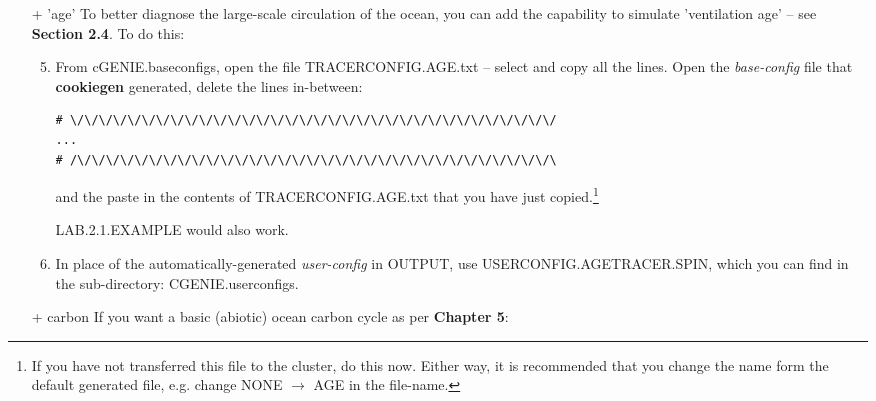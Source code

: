\begin{itemize}[noitemsep]
\setlength{\itemindent}{.05in}

\vspace{2mm}
\item [+ 'age'] To better diagnose the large-scale circulation of the ocean, you can add the capability to simulate 'ventilation age' -- see \textbf{Section 2.4}. To do this:

\begin{enumerate}
\setcounter{enumi}{4}

\vspace{1mm}
\item From \textsf{\footnotesize cGENIE.baseconfigs}, open the file \textsf{\footnotesize TRACERCONFIG.AGE.txt} -- select and copy all the lines. Open the \textit{base-config} file that \textbf{cookiegen} generated, delete the lines in-between:

\vspace{0mm}\footnotesize\begin{verbatim}
# \/\/\/\/\/\/\/\/\/\/\/\/\/\/\/\/\/\/\/\/\/\/\/\/\/\/\/\/\/\/\/\/\/\/
...
# /\/\/\/\/\/\/\/\/\/\/\/\/\/\/\/\/\/\/\/\/\/\/\/\/\/\/\/\/\/\/\/\/\/\
\end{verbatim}\normalsize\vspace{0mm}

and the paste in the contents of \textsf{\footnotesize TRACERCONFIG.AGE.txt} that you have just copied.\footnote{If you have not transferred this file to the cluster, do this now. Either way, it is recommended that you change the name form the default generated file, e.g. change \textsf{\footnotesize NONE} $\rightarrow$ \textsf{\footnotesize AGE} in the file-name.} 

\textsf{\footnotesize LAB.2.1.EXAMPLE} would also work.

\vspace{1mm}
\item In place of the automatically-generated \textit{user-config} in \textsf{\footnotesize OUTPUT}, use \textsf{\footnotesize USERCONFIG.AGETRACER.SPIN}, which you can find in the sub-directory: \textsf{\footnotesize CGENIE.userconfigs}.

\end{enumerate}

\vspace{2mm}
\item [+ carbon] If you want a basic (abiotic) ocean carbon cycle as per \textbf{Chapter 5}:

\begin{enumerate}
\setcounter{enumi}{4}


\end{enumerate}
\end{itemize}
